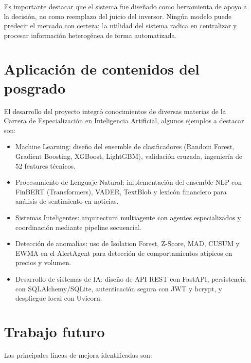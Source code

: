   Es importante destacar que el sistema fue diseñado como herramienta de apoyo a la decisión, 
  no como reemplazo del juicio del inversor. Ningún modelo puede predecir el mercado con      
  certeza; la utilidad del sistema radica en centralizar y procesar información heterogénea de   forma automatizada.

  \section{Aplicación de contenidos del posgrado}

  El desarrollo del proyecto integró conocimientos de diversas materias de la Carrera de      
  Especialización en Inteligencia Artificial, algunos ejemplos a destacar son:

  \begin{itemize}
      \item Machine Learning: diseño del ensemble de clasificadores (Random Forest,
  Gradient Boosting, XGBoost, LightGBM), validación cruzada, ingeniería de 52 features técnicos.
      \item Procesamiento de Lenguaje Natural: implementación del ensemble NLP con   
  FinBERT (Transformers), VADER, TextBlob y lexicón financiero para análisis de sentimiento en   noticias.
      \item Sistemas Inteligentes: arquitectura multiagente con agentes
  especializados y coordinación mediante pipeline secuencial.
      \item Detección de anomalías: uso de Isolation Forest, Z-Score, MAD, CUSUM y   
  EWMA en el AlertAgent para detección de comportamientos atípicos en precios y volumen.    
      \item Desarrollo de sistemas de IA: diseño de API REST con FastAPI,
  persistencia con SQLAlchemy/SQLite, autenticación segura con JWT y bcrypt, y despliegue     
  local con Uvicorn.
  \end{itemize}

  \section{Trabajo futuro}

  Las principales líneas de mejora identificadas son:

